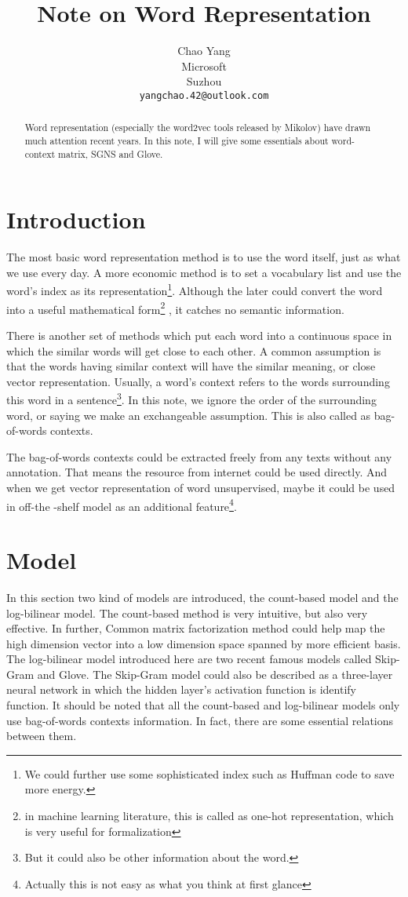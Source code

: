 \documentclass{article} %
\title{Note on Word Representation}
\author{
Chao Yang\\
Microsoft\\
Suzhou \\
\texttt{yangchao.42@outlook.com} \\
}
\begin{document}
\maketitle

\begin{abstract}
Word representation (especially the word2vec tools released by Mikolov) have drawn much attention recent years. In this note, I will give some essentials about word-context matrix, SGNS and Glove. 
\end{abstract}

\section{Introduction}
The most basic word representation method is to use the word itself, just as what we use every day. A more economic method is to set a vocabulary list and use the word's index as its representation\footnote{ We could further use some sophisticated index such as Huffman code to save more energy. }. Although the later could convert the word into a useful mathematical form\footnote {in machine learning literature, this is called as one-hot representation, which is very useful for formalization} , it catches no semantic information.

There is another set of methods which put each word into a continuous space in which the similar words will get close to each other. A common assumption is that the words having similar context will have the similar meaning, or close vector representation. Usually, a word's context refers to the words surrounding this word in a sentence\footnote{But it could also be other information about the word.}. In this note, we ignore the order of the surrounding word, or saying we make an exchangeable assumption. This is also called as bag-of-words contexts. 

The bag-of-words contexts could be extracted freely from any texts without any annotation. That means the resource from internet could be used directly. And when we get vector representation of word unsupervised, maybe it could be used in off-the -shelf model as an additional feature\footnote{Actually this is not easy as what you think at first glance}.

\section{Model}
In this section two kind of models are introduced, the count-based model and the log-bilinear model. The count-based method is very intuitive, but also very effective. In further, Common matrix factorization method could help map the high dimension vector into a low dimension space spanned by more efficient basis. The log-bilinear model introduced here are two recent famous models called Skip-Gram and Glove. The Skip-Gram model could also be described as a three-layer neural network in which the hidden layer's activation function is identify function. It should be noted that all the count-based and log-bilinear models only use bag-of-words contexts information. In fact, there are some essential relations between them. 
\end{document}
